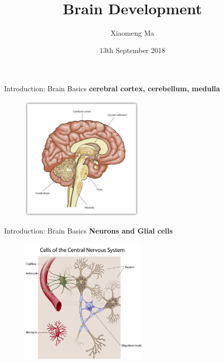 \documentclass{beamer} %
\title[PSY 242 Developmental Psychology]{Brain Development}
\institute[College of Staten Island]{College of Staten Island, CUNY}
\author{Xiaomeng Ma}
\date{13th September 2018}
\begin{document}
 
\begin{frame}
	\titlepage
\end{frame}
\begin{frame}{Introduction: Brain Basics}
\textbf{cerebral cortex, cerebellum, medulla}
\pause
    \begin{figure}
        \includegraphics[height = 6cm, keepaspectratio,]{cerebro.jpg}
    \end{figure}
\end{frame}
\begin{frame}{Introduction: Brain Basics}
\textbf{Neurons and Glial cells}
    \begin{figure}
        \includegraphics[height = 6cm, keepaspectratio,]{neurons-glial-cells-cns-18808418.jpg}
    \end{figure}
\end{frame}
\end{document}
